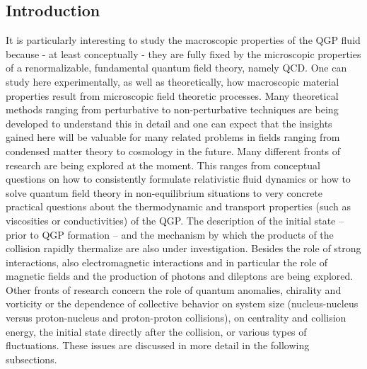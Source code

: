 \subsection{Introduction}

It is particularly interesting to study the macroscopic properties of 
  the QGP fluid because - at least conceptually - they are fully fixed 
  by the microscopic properties of a renormalizable, fundamental quantum 
  field theory, namely QCD. 
One can study here experimentally, as well as theoretically, how 
  macroscopic material properties result from microscopic field 
  theoretic processes. 
Many theoretical methods ranging from perturbative to non-perturbative 
  techniques are being developed to understand this in detail and one can 
  expect that the insights gained here will be valuable for many related 
  problems in fields ranging from condensed matter theory to cosmology in 
  the future.  
Many different fronts of research are being explored at the moment. 
This ranges from conceptual questions on how to consistently formulate 
  relativistic fluid dynamics or how to solve quantum field theory in 
  non-equilibrium situations to very concrete practical questions about 
  the thermodynamic and transport properties (such as viscosities or 
  conductivities) of the QGP. 
The description of the initial state -- prior to QGP formation --
  and the mechanism by which the products of the collision rapidly thermalize
	are also under investigation.
Besides the role of strong interactions, also electromagnetic interactions 
  and in particular the role of magnetic fields and the production of 
	photons and dileptons are being explored. 
Other fronts of research concern the role of quantum anomalies, chirality 
  and vorticity or the dependence of collective behavior on system size 
  (nucleus-nucleus versus proton-nucleus and proton-proton collisions), 
  on centrality and collision energy, the initial state directly after 
  the collision, or various types of fluctuations. 
These issues are discussed in more detail in the following subsections.





